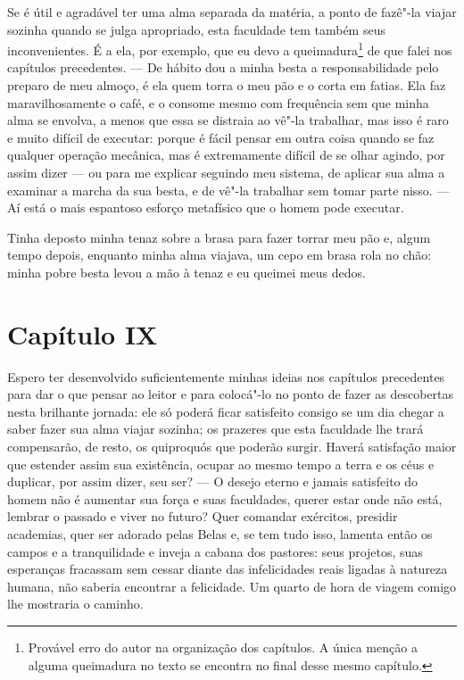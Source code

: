  Se é útil e agradável ter uma alma separada da matéria, a ponto de
fazê"-la viajar sozinha quando se julga apropriado, esta faculdade tem
também seus inconvenientes. É a ela, por exemplo, que eu devo a
queimadura\footnote{Provável erro do autor na organização dos capítulos. A única menção a alguma queimadura no texto se encontra no final desse mesmo capítulo.}  
de que falei nos capítulos precedentes. --- De hábito dou a                         
minha besta a responsabilidade pelo preparo de meu almoço, é ela quem												
torra o meu pão e o corta em fatias. Ela faz maravilhosamente o café, e
o consome mesmo com frequência sem que minha alma se envolva, a menos
que essa se distraia ao vê"-la trabalhar, mas isso é raro e muito
difícil de executar: porque é fácil pensar em outra coisa quando se faz
qualquer operação mecânica, mas é extremamente difícil de se olhar
agindo, por assim dizer --- ou para me explicar seguindo meu sistema,
de aplicar sua alma a examinar a marcha da sua besta, e de vê"-la
trabalhar sem tomar parte nisso. --- Aí está o mais espantoso esforço
metafísico que o homem pode executar.

 Tinha deposto minha tenaz sobre a brasa para fazer torrar meu pão e,
algum tempo depois, enquanto minha alma viajava, um cepo em brasa rola
no chão: minha pobre besta levou a mão à tenaz e eu queimei meus dedos.

\section*{Capítulo IX}

 Espero ter desenvolvido suficientemente minhas ideias nos capítulos
precedentes para dar o que pensar ao leitor e para colocá"-lo no ponto
de fazer as descobertas nesta brilhante jornada: ele só poderá ficar
satisfeito consigo se um dia chegar a saber fazer sua alma viajar
sozinha; os prazeres que esta faculdade lhe trará compensarão, de
resto, os quiproquós que poderão surgir. Haverá satisfação maior que
estender assim sua existência, ocupar ao mesmo tempo a terra e os céus
e duplicar, por assim dizer, seu ser? --- O desejo eterno e jamais
satisfeito do homem não é aumentar sua força e suas faculdades, querer
estar onde não está, lembrar o passado e viver no futuro? Quer comandar
exércitos, presidir academias, quer ser adorado pelas Belas e, se tem
tudo isso, lamenta então os campos e a tranquilidade e inveja a cabana
dos pastores: seus projetos, suas esperanças fracassam sem cessar
diante das infelicidades reais ligadas à natureza humana, não saberia
encontrar a felicidade. Um quarto de hora de viagem comigo lhe
mostraria o caminho.

